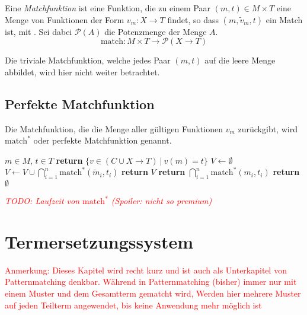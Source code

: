 \documentclass{article}
\begin{document}
Eine \emph{Matchfunktion} ist eine Funktion, die zu einem Paar $(m, t) \in M \times T$ eine Menge von Funktionen der Form $v_m \colon X \rightarrow T$ findet, so dass $(m, \tilde{v}_m, t)$ ein Match ist, mit . Sei dabei $\mathcal{P}(A)$ die Potenzmenge der Menge $A$.
$$\mathrm{match} \colon M \times T \rightarrow \mathcal{P}(X \rightarrow T)$$

Die triviale Matchfunktion, welche jedes Paar $(m, t)$ auf die leere Menge abbildet, wird hier nicht weiter betrachtet.

\subsection{Perfekte Matchfunktion}
Die Matchfunktion, die die Menge aller gültigen Funktionen $v_m$ zurückgibt, wird $\mathrm{match}^*$ oder perfekte Matchfunktion genannt.

\begin{algorithm}
\caption{$\mathrm{match}^* \colon M \times T \rightarrow \mathcal{P}(X \rightarrow T)$}\label{perfectMatch}
\begin{algorithmic}[1] %
\Require $m \in M$, $t \in T$
	\State \textbf{return} $\{v \in (C \cup X \rightarrow T) ~|~ v(m) = t\}$ 
\EndIf
{}
		\State $V \leftarrow \emptyset$
			\State $V \leftarrow V \cup \bigcap_{i = 1}^n {\mathrm{match}^*(\tilde m_i, t_i)}$
		\EndFor
		\State \textbf{return} $V$
	\Else
		\State \textbf{return} $\bigcap_{i = 1}^n {\mathrm{match}^*(m_i, t_i)}$
	\EndIf
\EndIf
\State \textbf{return} $\emptyset$
\end{algorithmic}
\end{algorithm}
\textcolor{red}{\textit{TODO: Laufzeit von $\mathrm{match}^*$ (Spoiler: nicht so premium)}}

\section{Termersetzungssystem}
\textcolor{red}{
\begin{itshape}
Anmerkung: Dieses Kapitel wird recht kurz und ist auch als Unterkapitel von Patternmatching denkbar. 
Während in Patternmatching (bisher) immer nur mit einem Muster und dem Gesamtterm gematcht wird, Werden hier mehrere Muster auf jeden Teilterm angewendet, bis keine Anwendung mehr möglich ist
\end{itshape}
}
\end{document}
